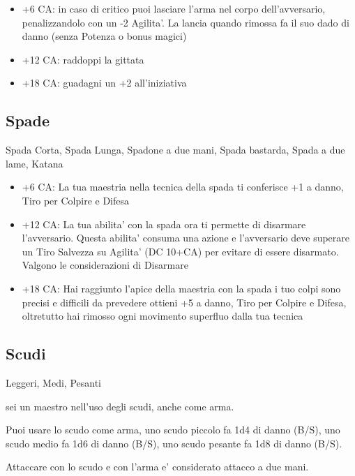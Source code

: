 \documentclass[a4paper,11pt,twoside,openany]{dndbook}
\begin{document}
\begin{itemize}

\item +6 CA: in caso di critico puoi lasciare l'arma nel corpo dell'avversario,
penalizzandolo con un -2 Agilita'. La lancia quando rimossa fa il suo dado di danno (senza
Potenza o bonus magici)

\item +12 CA: raddoppi la gittata

\item +18 CA: guadagni un +2 all'iniziativa
\end{itemize}

\subsection{Spade} Spada Corta, Spada Lunga, Spadone a due mani, Spada bastarda, Spada a due lame, Katana

\begin{itemize}

\item +6 CA: La tua maestria nella tecnica della spada ti conferisce +1
a danno, Tiro per Colpire e Difesa

\item +12 CA: La tua abilita' con la spada ora ti permette di disarmare l'avversario. Questa abilita' consuma una azione e l'avversario deve superare un Tiro Salvezza su Agilita' (DC 10+CA) per evitare di essere disarmato. Valgono le considerazioni di Disarmare

\item +18 CA: Hai raggiunto l'apice della maestria con la spada i tuo colpi sono precisi e difficili da prevedere ottieni +5 a danno, Tiro per Colpire e Difesa, oltretutto hai rimosso ogni movimento superfluo dalla tua tecnica
\end{itemize}

\subsection{Scudi} Leggeri, Medi, Pesanti

sei un maestro nell'uso degli scudi, anche come arma.

Puoi usare lo scudo come arma, uno scudo piccolo fa 1d4 di danno (B/S), uno scudo medio fa 1d6 di danno (B/S), uno scudo pesante fa 1d8 di danno (B/S).

Attaccare con lo scudo e con l'arma e' considerato attacco a due mani.
\end{document}
